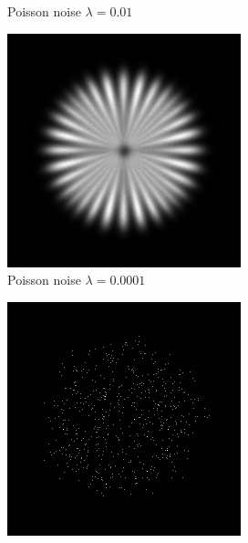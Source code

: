 \documentclass{./packages/optica-article}
\begin{document}
\begin{figure}[hbp]
\begin{center}
\begin{subfigure}[t]{0.25\textwidth}
			\caption{Poisson noise $\lambda = 0.01$}\label{fig:sim:np0.01}
		\end{subfigure}
		\hfill
		\begin{subfigure}[t]{0.25\textwidth}\centering
			\centering
			\includegraphics[width=\textwidth]{Simulation deconvolution/ref_np_0.0001}
			\caption{Poisson noise $\lambda = 0.0001$}
		\end{subfigure}
		\hfill
		\begin{subfigure}[t]{0.25\textwidth}\centering
			\centering
			\includegraphics[width=\textwidth]{Simulation deconvolution/ref_np_10}

\end{subfigure}
\end{center}
\end{figure}
\end{document}
